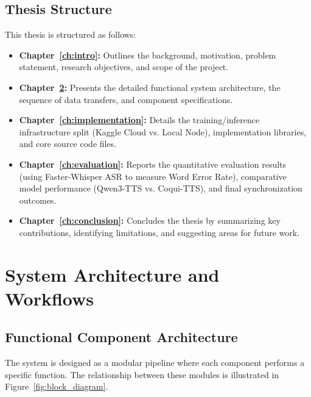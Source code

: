 \documentclass[a4paper,12pt]{report}
\begin{document}
\section{Thesis Structure}
This thesis is structured as follows:
\begin{itemize}
    \item \textbf{Chapter~\ref{ch:intro}:} Outlines the background, motivation, problem statement, research objectives, and scope of the project.
    \item \textbf{Chapter~\ref{ch:architecture}:} Presents the detailed functional system architecture, the sequence of data transfers, and component specifications.
    \item \textbf{Chapter~\ref{ch:implementation}:} Details the training/inference infrastructure split (Kaggle Cloud vs. Local Node), implementation libraries, and core source code files.
    \item \textbf{Chapter~\ref{ch:evaluation}:} Reports the quantitative evaluation results (using Faster-Whisper ASR to measure Word Error Rate), comparative model performance (Qwen3-TTS vs. Coqui-TTS), and final synchronization outcomes.
    \item \textbf{Chapter~\ref{ch:conclusion}:} Concludes the thesis by summarizing key contributions, identifying limitations, and suggesting areas for future work.
\end{itemize}
\newpage

\chapter{System Architecture and Workflows}
\label{ch:architecture}

\section{Functional Component Architecture}
The system is designed as a modular pipeline where each component performs a specific function. The relationship between these modules is illustrated in Figure~\ref{fig:block_diagram}.
\end{document}
